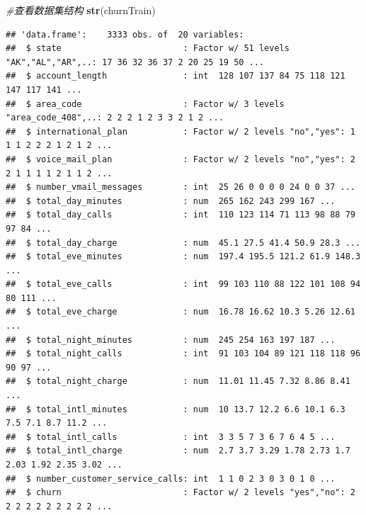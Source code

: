 \documentclass[
]{article}
\newenvironment{Shaded}{\begin{snugshade}}{\end{snugshade}}
\newcommand{\CommentTok}[1]{\textcolor[rgb]{0.56,0.35,0.01}{\textit{#1}}}
\newcommand{\KeywordTok}[1]{\textcolor[rgb]{0.13,0.29,0.53}{\textbf{#1}}}
\newcommand{\NormalTok}[1]{#1}
\begin{document}
\begin{Shaded}
\begin{Highlighting}[]
\CommentTok{#查看数据集结构}
\KeywordTok{str}\NormalTok{(churnTrain)}
\end{Highlighting}
\end{Shaded}

\begin{verbatim}
## 'data.frame':    3333 obs. of  20 variables:
##  $ state                        : Factor w/ 51 levels "AK","AL","AR",..: 17 36 32 36 37 2 20 25 19 50 ...
##  $ account_length               : int  128 107 137 84 75 118 121 147 117 141 ...
##  $ area_code                    : Factor w/ 3 levels "area_code_408",..: 2 2 2 1 2 3 3 2 1 2 ...
##  $ international_plan           : Factor w/ 2 levels "no","yes": 1 1 1 2 2 2 1 2 1 2 ...
##  $ voice_mail_plan              : Factor w/ 2 levels "no","yes": 2 2 1 1 1 1 2 1 1 2 ...
##  $ number_vmail_messages        : int  25 26 0 0 0 0 24 0 0 37 ...
##  $ total_day_minutes            : num  265 162 243 299 167 ...
##  $ total_day_calls              : int  110 123 114 71 113 98 88 79 97 84 ...
##  $ total_day_charge             : num  45.1 27.5 41.4 50.9 28.3 ...
##  $ total_eve_minutes            : num  197.4 195.5 121.2 61.9 148.3 ...
##  $ total_eve_calls              : int  99 103 110 88 122 101 108 94 80 111 ...
##  $ total_eve_charge             : num  16.78 16.62 10.3 5.26 12.61 ...
##  $ total_night_minutes          : num  245 254 163 197 187 ...
##  $ total_night_calls            : int  91 103 104 89 121 118 118 96 90 97 ...
##  $ total_night_charge           : num  11.01 11.45 7.32 8.86 8.41 ...
##  $ total_intl_minutes           : num  10 13.7 12.2 6.6 10.1 6.3 7.5 7.1 8.7 11.2 ...
##  $ total_intl_calls             : int  3 3 5 7 3 6 7 6 4 5 ...
##  $ total_intl_charge            : num  2.7 3.7 3.29 1.78 2.73 1.7 2.03 1.92 2.35 3.02 ...
##  $ number_customer_service_calls: int  1 1 0 2 3 0 3 0 1 0 ...
##  $ churn                        : Factor w/ 2 levels "yes","no": 2 2 2 2 2 2 2 2 2 2 ...
\end{verbatim}
\end{document}

